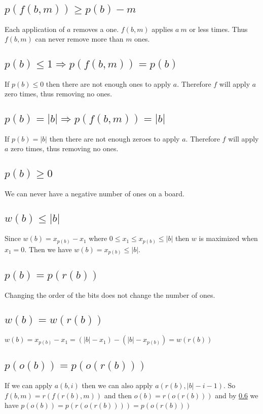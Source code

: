 \documentclass{article}
\begin{document}
\subsection{$p(f(b,m))\ge p(b)-m$}
Each application of $a$ removes a one. $f(b,m)$ applies $a\ m$ or less times. Thus $f(b,m)$ can never remove more than $m$ ones. 

\subsection{$p(b) \le 1 \Rightarrow p(f(b,m)) = p(b)$}
If $p(b) \le 0$ then there are not enough ones to apply $a$. 
Therefore $f$ will apply $a$ zero times, thus removing no ones.

\subsection{$p(b) = |b| \Rightarrow p(f(b,m)) = |b|$}
If $p(b) = |b| $ then there are not enough zeroes to apply $a$. 
Therefore $f$ will apply $a$ zero times, thus removing no ones.

\subsection{$p(b)\ge 0$}
We can never have a negative number of ones on a board.

\subsection{$w(b)\le |b|$}
Since $w(b) = x_{p(b)}-x_1$ where $0\le x_1\le x_{p(b)} \le |b|$ then $w$ is maximized when $x_1=0$.
Then we have $w(b) =x_{p(b)}\le |b|$. 

\subsection{$p(b) = p(r(b))$}\label{rev_count}
Changing the order of the bits does not change the number of ones.

\subsection{$w(b) = w(r(b))$}
$w(b) = x_{p(b)}-x_1= (|b|-x_{1})-(|b|-x_{p(b)})=w(r(b))$

\subsection{$p(o(b)) = p(o(r(b)))$}
If we can apply $a(b,i)$ then we can also apply $a(r(b),|b|-i-1)$. 
So $f(b,m) = r(f(r(b),m))$ and then $o(b)=r(o(r(b)))$ and by \ref{rev_count} we have $p(o(b)) = p(r(o(r(b))))=p(o(r(b)))$
\end{document}
